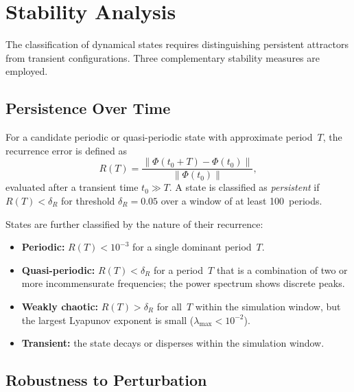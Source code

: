 \documentclass[12pt,a4paper]{article}
\begin{document}
\section{Stability Analysis}\label{sec:stability}

The classification of dynamical states requires distinguishing
persistent attractors from transient configurations.  Three
complementary stability measures are employed.

\subsection{Persistence Over Time}\label{sec:persist}

For a candidate periodic or quasi-periodic state with approximate
period~$T$, the recurrence error is defined as
\begin{equation}\label{eq:recurrence}
  R(T) = \frac{\lVert \Phi(t_0 + T) - \Phi(t_0) \rVert}
              {\lVert \Phi(t_0) \rVert},
\end{equation}
evaluated after a transient time $t_0 \gg T$.  A state is classified
as \emph{persistent} if $R(T) < \delta_R$ for threshold $\delta_R = 0.05$
over a window of at least 100~periods.

States are further classified by the nature of their recurrence:
\begin{itemize}[nosep]
  \item \textbf{Periodic:} $R(T) < 10^{-3}$ for a single dominant
    period~$T$.
  \item \textbf{Quasi-periodic:} $R(T) < \delta_R$ for a period~$T$
    that is a combination of two or more incommensurate
    frequencies; the power spectrum shows discrete peaks.
  \item \textbf{Weakly chaotic:} $R(T) > \delta_R$ for all~$T$
    within the simulation window, but the largest Lyapunov exponent
    is small ($\lambda_{\max} < 10^{-2}$).
  \item \textbf{Transient:} the state decays or disperses within the
    simulation window.
\end{itemize}

\subsection{Robustness to Perturbation}\label{sec:robust}
\end{document}
